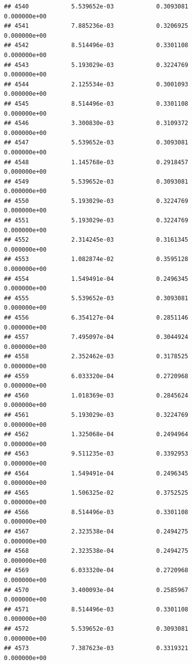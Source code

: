 \documentclass[
]{article}
\begin{document}
\begin{verbatim}
## 4540            5.539652e-03            0.3093081            0.000000e+00
## 4541            7.885236e-03            0.3206925            0.000000e+00
## 4542            8.514496e-03            0.3301108            0.000000e+00
## 4543            5.193029e-03            0.3224769            0.000000e+00
## 4544            2.125534e-03            0.3001093            0.000000e+00
## 4545            8.514496e-03            0.3301108            0.000000e+00
## 4546            3.300830e-03            0.3109372            0.000000e+00
## 4547            5.539652e-03            0.3093081            0.000000e+00
## 4548            1.145768e-03            0.2918457            0.000000e+00
## 4549            5.539652e-03            0.3093081            0.000000e+00
## 4550            5.193029e-03            0.3224769            0.000000e+00
## 4551            5.193029e-03            0.3224769            0.000000e+00
## 4552            2.314245e-03            0.3161345            0.000000e+00
## 4553            1.082874e-02            0.3595128            0.000000e+00
## 4554            1.549491e-04            0.2496345            0.000000e+00
## 4555            5.539652e-03            0.3093081            0.000000e+00
## 4556            6.354127e-04            0.2851146            0.000000e+00
## 4557            7.495097e-04            0.3044924            0.000000e+00
## 4558            2.352462e-03            0.3178525            0.000000e+00
## 4559            6.033320e-04            0.2720968            0.000000e+00
## 4560            1.018369e-03            0.2845624            0.000000e+00
## 4561            5.193029e-03            0.3224769            0.000000e+00
## 4562            1.325068e-04            0.2494964            0.000000e+00
## 4563            9.511235e-03            0.3392953            0.000000e+00
## 4564            1.549491e-04            0.2496345            0.000000e+00
## 4565            1.506325e-02            0.3752525            0.000000e+00
## 4566            8.514496e-03            0.3301108            0.000000e+00
## 4567            2.323538e-04            0.2494275            0.000000e+00
## 4568            2.323538e-04            0.2494275            0.000000e+00
## 4569            6.033320e-04            0.2720968            0.000000e+00
## 4570            3.400093e-04            0.2585967            0.000000e+00
## 4571            8.514496e-03            0.3301108            0.000000e+00
## 4572            5.539652e-03            0.3093081            0.000000e+00
## 4573            7.387623e-03            0.3319321            0.000000e+00

\end{verbatim}
\end{document}
